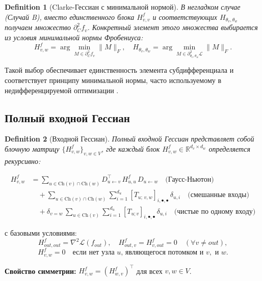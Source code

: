 \documentclass[11pt]{article}
\newtheorem{definition}{Definition}
\newcommand{\Ch}{\mathrm{Ch}} %
\begin{document}
\begin{definition}[Clarke-Гессиан с минимальной нормой]
  В негладком случае (Случай B), вместо единственного блока $H^f_{v,v}$ и соответствующих
  $H_{\theta_v,\theta_w}$ получаем множество $\partial_C^2f_v$. Конкретный элемент этого множества выбирается
  из условия минимальной нормы Фробениуса:
  \[
    H^f_{v,w}
    = \arg\min_{M\in\partial_C^2 f_v}\|M\|_F,
    \quad
    H_{\theta_v,\theta_w}
    = \arg\min_{M\in\partial^2_{\theta_v,\theta_w}\!\mathcal L}\|M\|_F.
  \]
\end{definition}

Такой выбор обеспечивает единственность элемента субдифференциала и соответствует принципу минимальной нормы,
часто используемому в недифференцируемой оптимизации \citep{bolte2020conservative}.

\subsection{Полный входной Гессиан}

\begin{definition}[Входной Гессиан]
  Полный входной Гессиан представляет собой блочную матрицу $\{H^f_{v,w}\}_{v,w\in V}$, где каждый блок
  $H^f_{v,w}\in\mathbb{R}^{d_v\times d_w}$ определяется рекурсивно:
\end{definition}

\begin{equation}\label{eq:Hf}
  \boxed{
    \begin{split}
      H^f_{v,w}
      &=
      \sum_{u\in\Ch(v)\cap\Ch(w)}
      D_{u\gets v}^\top\,H^f_{u,u}\,D_{u\gets w}
      \quad\text{(Гаусс-Ньютон)}\\
      &\quad+
      \sum_{u\in\Ch(v)\cap\Ch(w)}
      \sum_{i=1}^{d_u}
      [T_{u;\,v,w}]_{i,\bullet,\bullet}\,\delta_{u,i}
      \quad\text{(смешанные входы)}\\
      &\quad+
      \delta_{v=w}\,
      \sum_{u\in\Ch(v)}
      \sum_{i=1}^{d_u}
      [T_{u;v}]_{i,\bullet,\bullet}\,\delta_{u,i}
      \quad\text{(чистые по одному входу)}
    \end{split}
  }
\end{equation}

с базовыми условиями:
\[
  H^f_{out,out} = \nabla^2\mathcal L(f_{out}),
  \quad
  H^f_{out,v} = H^f_{v,out} = 0\quad (\forall v\neq out),
\]
\[
  H^f_{v,w} = 0
  \quad\text{если нет узла }u\text{, являющегося потомком и }v,\text{ и }w.
\]

\textbf{Свойство симметрии:} $H^f_{v,w}=(H^f_{w,v})^\top$ для всех $v,w \in V$.
\end{document}
